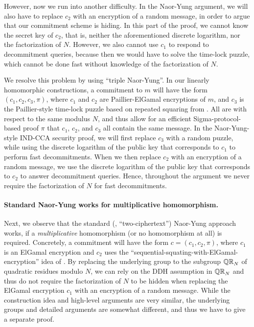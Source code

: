 However, now we run into another difficulty. In the Naor-Yung argument, we will also have to replace $c_2$ with an encryption of a random message, in order to argue that our commitment scheme is hiding. In this part of the proof, we cannot know the secret key of $c_2$, that is, neither the aforementioned discrete logarithm, nor the factorization of $N$. However, we also cannot use $c_1$ to respond to decommitment queries, because then we would have to solve the time-lock puzzle, which cannot be done fast without knowledge of the factorization of $N$.

We resolve this problem by using ``triple Naor-Yung''. In our linearly homomorphic constructions, a commitment to $m$ will have the form $(c_1, c_2, c_3, \pi)$, where $c_1$ and $c_2$ are Paillier-ElGamal encryptions of $m$, and $c_3$ is the Paillier-style time-lock puzzle based on repeated squaring from \cite{C:MalThy19}. All are with respect to the same modulus $N$, and thus allow for an efficient Sigma-protocol-based proof $\pi$ that $c_1$, $c_2$, and $c_3$ all contain the same message. In the Naor-Yung-style IND-CCA security proof, we will first replace $c_3$ with a random puzzle, while using the discrete logarithm of the public key that corresponds to $c_1$ to perform fast decommitments. When we then replace $c_2$ with an encryption of a random message, we use the discrete logarithm of the public key that corresponds to $c_2$ to answer decommitment queries. Hence, throughout the argument we never require the factorization of $N$ for fast decommitments.


\paragraph{Standard Naor-Yung works for multiplicative homomorphism.}
Next, we observe that the standard (\ie, ``two-ciphertext'') Naor-Yung approach works, if a \emph{multiplicative} homomorphism (or no homomorphism at all) is required. Concretely, a commitment will have the form $c = (c_1, c_2, \pi)$, where $c_1$ is an ElGamal encryption and $c_2$ uses the ``sequential-squating-with-ElGamal-encryption'' idea of \cite{C:MalThy19}. By replacing the underlying group to the subgroup $\mathbb{QR}_N$ of quadratic residues modulo $N$, we can rely on the DDH assumption in $\mathbb{QR}_N$ and thus do not require the factorization of $N$ to be hidden when replacing the ElGamal encryption $c_1$ with an encryption of a random message.
While the construction idea and high-level arguments are very similar, the underlying groups and detailed arguments are somewhat different, and thus we have to give a separate proof.




